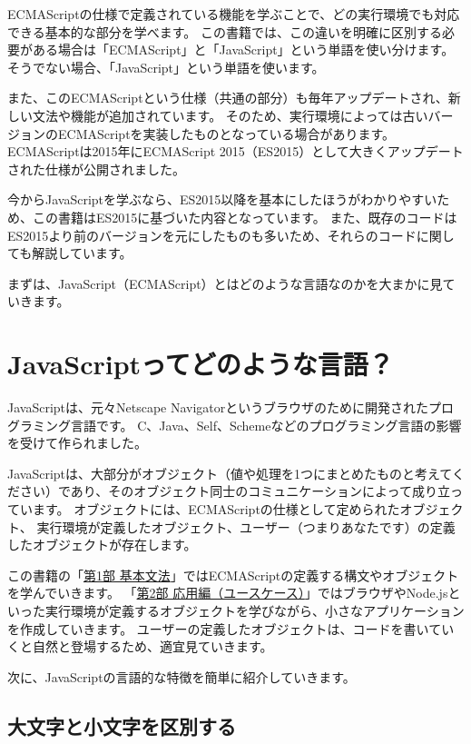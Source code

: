 ECMAScriptの仕様で定義されている機能を学ぶことで、どの実行環境でも対応できる基本的な部分を学べます。
この書籍では、この違いを明確に区別する必要がある場合は「ECMAScript」と「JavaScript」という単語を使い分けます。
そうでない場合、「JavaScript」という単語を使います。

また、このECMAScriptという仕様（共通の部分）も毎年アップデートされ、新しい文法や機能が追加されています。
そのため、実行環境によっては古いバージョンのECMAScriptを実装したものとなっている場合があります。
ECMAScriptは2015年にECMAScript 2015（ES2015）として大きくアップデートされた仕様が公開されました。

今からJavaScriptを学ぶなら、ES2015以降を基本にしたほうがわかりやすいため、この書籍はES2015に基づいた内容となっています。
また、既存のコードはES2015より前のバージョンを元にしたものも多いため、それらのコードに関しても解説しています。

まずは、JavaScript（ECMAScript）とはどのような言語なのかを大まかに見ていきます。

\hypertarget{about-javascript}{%
\section{JavaScriptってどのような言語？}\label{about-javascript}}

JavaScriptは、元々Netscape Navigatorというブラウザのために開発されたプログラミング言語です。
C、Java、Self、Schemeなどのプログラミング言語の影響を受けて作られました。

JavaScriptは、大部分がオブジェクト（値や処理を1つにまとめたものと考えてください）であり、そのオブジェクト同士のコミュニケーションによって成り立っています。
オブジェクトには、ECMAScriptの仕様として定められたオブジェクト、
実行環境が定義したオブジェクト、ユーザー（つまりあなたです）の定義したオブジェクトが存在します。

この書籍の「\hyperlink{basic-grammar}{第1部 基本文法}」ではECMAScriptの定義する構文やオブジェクトを学んでいきます。
「\hyperlink{use-case}{第2部 応用編（ユースケース）}」ではブラウザやNode.jsといった実行環境が定義するオブジェクトを学びながら、小さなアプリケーションを作成していきます。
ユーザーの定義したオブジェクトは、コードを書いていくと自然と登場するため、適宜見ていきます。

次に、JavaScriptの言語的な特徴を簡単に紹介していきます。

\hypertarget{case-sensitive}{%
\subsection{大文字と小文字を区別する}\label{case-sensitive}}

